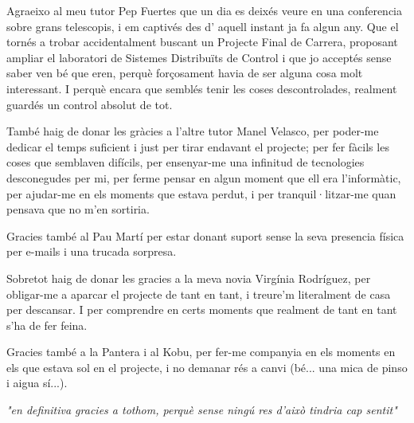 

\begin{acknowledgements}      %

Agraeixo al meu tutor Pep Fuertes que un dia es deixés veure en una conferencia sobre grans telescopis, i em captivés des d' aquell instant ja fa algun any. 
Que el tornés a trobar accidentalment buscant un Projecte Final de Carrera, proposant ampliar el laboratori de Sistemes Distribuïts de Control i que jo acceptés sense saber ven bé que eren, perquè forçosament havia de ser alguna cosa molt interessant. I perquè encara que semblés tenir les coses descontrolades, realment guardés un control absolut de tot.

També haig de donar les gràcies a l'altre tutor Manel Velasco, per poder-me dedicar el temps suficient i just per tirar endavant el projecte; per fer fàcils les coses que semblaven difícils, per ensenyar-me una infinitud de tecnologies desconegudes per mi, per ferme pensar en algun moment que ell era l'informàtic, per ajudar-me en els moments que estava perdut, i per tranquil·litzar-me quan pensava que no m'en sortiria.

Gracies també al Pau Martí per estar donant suport sense la seva presencia física per e-mails i una trucada sorpresa. 

Sobretot haig de donar les gracies a la meva novia Virgínia Rodríguez, per obligar-me a aparcar el projecte de tant en tant, i treure'm literalment de casa per descansar. I per comprendre en certs moments que realment de tant en tant s'ha de fer feina.

Gracies també a la Pantera i al Kobu, per fer-me companyia en els moments en els que estava sol en el projecte, i no demanar rés a canvi (bé... una mica de pinso i aigua sí...).
\begin{flushright}
\begin{minipage}[l]{0.5\linewidth}
\emph{"en definitiva gracies a tothom, perquè sense ningú res d'això tindria cap sentit"}
\end{minipage}
\end{flushright}

\end{acknowledgements}



